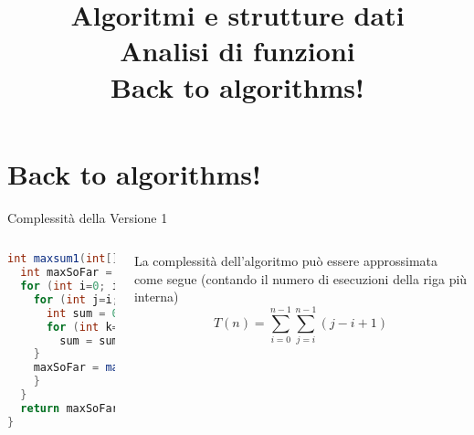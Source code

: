 

\graphicspath{{figs/02/}}

\usepackage{cancel}
\usepackage{mleftright}

\def\arraystretch{1.1}

\newcommand*{\ballref}[1]{%
    \begin{pgfpicture}{-1ex}{-0.65ex}{1ex}{1ex}
    \usebeamercolor[fg]{item projected}
    {\pgftransformscale{1.75}\pgftext{\normalsize\pgfuseshading{bigsphere}}}
    {\pgftransformshift{\pgfpoint{0pt}{0.5pt}}
      \pgftext{\usebeamerfont*{item projected}\ref{#1}}}
  \end{pgfpicture}}%









\title[ASD - Analisi di funzioni]{\textbf{Algoritmi e strutture dati}\\[12pt]Analisi di funzioni\\Back to algorithms!}

\FrameTitle{}

\section{Back to algorithms!}

\begin{frame}[fragile]{Complessità della Versione 1}

\begin{columns}[T]
\small
\begin{lstlisting}[language=java]
int maxsum1(int[] A, int n) {
  int maxSoFar = 0;
  for (int i=0; i < n; i++) {
    for (int j=i; j < n; j++) {
      int sum = 0;
      for (int k=i; k <= j; k++) {
        sum = sum + A[k];
    }
    maxSoFar = max(maxSoFar, sum);
    }
  }
  return maxSoFar;
}
\end{lstlisting}
La complessità dell'algoritmo può essere approssimata come segue (contando
il numero di esecuzioni della riga più interna)
\[
T(n) = \sum_{i=0}^{n-1} \sum_{j=i}^{n-1} (j-i+1)
\]
\end{columns}

\end{frame}

